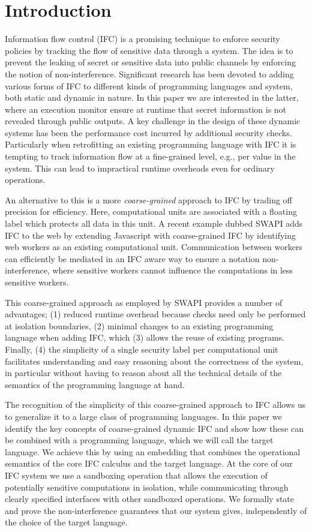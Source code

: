 \section{Introduction}
\label{sec:intro}

Information flow control (IFC) is a promising technique to enforce
security policies by tracking the flow of sensitive data through
a system.  The idea is to prevent the leaking of secret or sensitive
data into public channels by enforcing the notion of non-interference.
Significant research has been devoted to adding various
forms of IFC to different kinds of programming languages and system,
both static and dynamic in nature.  In this paper we are interested
in the latter, where an execution monitor ensure at runtime that secret
information is not revealed through public outputs.
A key challenge in the design of these dynamic systems has been the
performance cost incurred by additional security checks.
Particularly when retrofitting an existing programming language with
IFC it is tempting to track information flow at a fine-grained level,
e.g., per value in the system.  This can lead to impractical
runtime overheads even for ordinary operations.

An alternative to this is a more \textit{coarse-grained} approach
to IFC by trading off precision for efficiency.  Here, computational
units are associated with a floating label which protects all data
in this unit.
A recent example dubbed SWAPI adds IFC to the web by extending
Javascript with coarse-grained IFC by identifying web workers as
an existing computational unit.  Communication between workers can
efficiently be mediated in an IFC aware way to ensure a notation
non-interference, where sensitive workers cannot influence the
computations in less sensitive workers.

This coarse-grained approach as employed by SWAPI provides a number
of advantages; (1) reduced runtime overhead because checks need only
be performed at isolation boundaries, (2) minimal changes to an
existing programming language when adding IFC, which (3) allows
the reuse of existing programs.  Finally, (4) the simplicity
of a single security label per computational unit facilitates
understanding and easy reasoning about the correctness of the
system, in particular without having to reason about all the
technical details of the semantics of the programming language
at hand.

The recognition of the simplicity of this coarse-grained approach
to IFC allows us to generalize it to a large class of programming
languages.  In this paper we identify the key concepts of coarse-grained
dynamic IFC and show how these can be combined with a programming
language, which we will call the target language.  We achieve this
by using an embedding that combines the operational semantics
of the core IFC calculus and the target language.
At the core of our IFC system we use a sandboxing operation that allows
the execution of potentially sensitive computations in isolation,
while communicating through clearly specified interfaces with other
sandboxed operations.
We formally state and prove the non-interference guarantees that our
system gives, independently of the choice of the target language.

